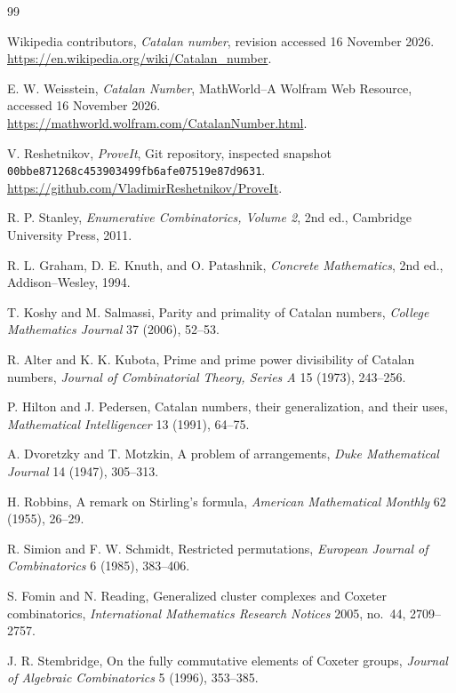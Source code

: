 \begin{thebibliography}{99}

Wikipedia contributors,
\emph{Catalan number}, revision accessed 16 November 2026.
\url{https://en.wikipedia.org/wiki/Catalan_number}.

E. W. Weisstein,
\emph{Catalan Number}, MathWorld--A Wolfram Web Resource,
accessed 16 November 2026.
\url{https://mathworld.wolfram.com/CatalanNumber.html}.

V. Reshetnikov,
\emph{ProveIt}, Git repository, inspected snapshot
\texttt{00bbe871268c453903499fb6afe07519e87d9631}.
\url{https://github.com/VladimirReshetnikov/ProveIt}.

R. P. Stanley,
\emph{Enumerative Combinatorics, Volume 2},
2nd ed., Cambridge University Press, 2011.

R. L. Graham, D. E. Knuth, and O. Patashnik,
\emph{Concrete Mathematics}, 2nd ed., Addison--Wesley, 1994.

T. Koshy and M. Salmassi,
Parity and primality of Catalan numbers,
\emph{College Mathematics Journal} 37 (2006), 52--53.

R. Alter and K. K. Kubota,
Prime and prime power divisibility of Catalan numbers,
\emph{Journal of Combinatorial Theory, Series A} 15 (1973), 243--256.

P. Hilton and J. Pedersen,
Catalan numbers, their generalization, and their uses,
\emph{Mathematical Intelligencer} 13 (1991), 64--75.

A. Dvoretzky and T. Motzkin,
A problem of arrangements,
\emph{Duke Mathematical Journal} 14 (1947), 305--313.

H. Robbins,
A remark on Stirling's formula,
\emph{American Mathematical Monthly} 62 (1955), 26--29.

R. Simion and F. W. Schmidt,
Restricted permutations,
\emph{European Journal of Combinatorics} 6 (1985), 383--406.

S. Fomin and N. Reading,
Generalized cluster complexes and Coxeter combinatorics,
\emph{International Mathematics Research Notices} 2005, no.~44,
2709--2757.

J. R. Stembridge,
On the fully commutative elements of Coxeter groups,
\emph{Journal of Algebraic Combinatorics} 5 (1996), 353--385.

\end{thebibliography}
